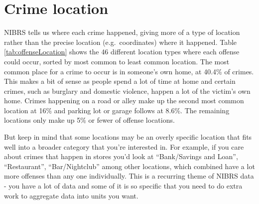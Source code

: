 \documentclass[
  12pt,
  openany]{book}
\begin{document}
\section{Crime location}\label{crime-location}

NIBRS tells us where each crime happened, giving more of a type of location rather than the precise location (e.g.~coordinates) where it happened. Table \ref{tab:offenseLocation} shows the 46 different location types where each offense could occur, sorted by most common to least common location. The most common place for a crime to occur is in someone's own home, at 40.4\% of crimes. This makes a bit of sense as people spend a lot of time at home and certain crimes, such as burglary and domestic violence, happen a lot of the victim's own home. Crimes happening on a road or alley make up the second most common location at 16\% and parking lot or garage follows at 8.6\%. The remaining locations only make up 5\% or fewer of offense locations.

But keep in mind that some locations may be an overly specific location that fits well into a broader category that you're interested in. For example, if you care about crimes that happen in stores you'd look at ``Bank/Savings and Loan'', ``Restaurant'', ``Bar/Nightclub'' among other locations, which combined have a lot more offenses than any one individually. This is a recurring theme of NIBRS data - you have a lot of data and some of it is so specific that you need to do extra work to aggregate data into units you want.
\end{document}
